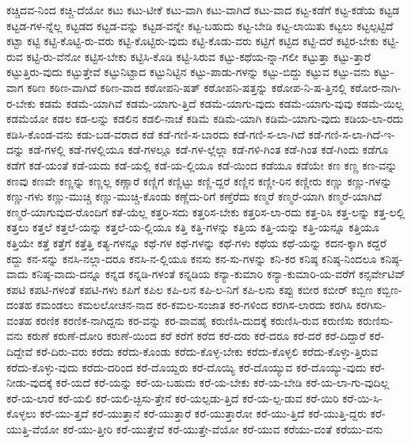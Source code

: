 {ಕಚ್ಚಿದವ-ನಿಂದ
ಕಚ್ಚಿ-ದೆಯೋ
ಕಟು
ಕಟು-ಟೀಕೆ
ಕಟು-ವಾಗಿ
ಕಟು-ವಾಗಿದೆ
ಕಟು-ವಾದ
ಕಟ್ಟ-ಕಡೆಗೆ
ಕಟ್ಟ-ಕಡೆಯ
ಕಟ್ಟಡ
ಕಟ್ಟಡ-ಗಳ-ನ್ನೆಲ್ಲ
ಕಟ್ಟಡದ
ಕಟ್ಟಡ-ವನ್ನು
ಕಟ್ಟಡ-ವನ್ನೇ
ಕಟ್ಟ-ಬಹುದು
ಕಟ್ಟ-ಬೇಡಿ
ಕಟ್ಟ-ಲಾಯಿತು
ಕಟ್ಟಲು
ಕಟ್ಟಲ್ಪಟ್ಟಿದೆ
ಕಟ್ಟಾ
ಕಟ್ಟಿ
ಕಟ್ಟಿ-ಕೊಟ್ಟಿ-ರು-ವರು
ಕಟ್ಟಿ-ಕೊಟ್ಟಿರು-ವುದು
ಕಟ್ಟಿ-ಕೊಡು-ವರು
ಕಟ್ಟಿಗೆ
ಕಟ್ಟಿದ
ಕಟ್ಟಿ-ದರೆ
ಕಟ್ಟಿರ-ಬೇಕು
ಕಟ್ಟಿ-ರುವ
ಕಟ್ಟಿ-ರು-ವೆನೋ
ಕಟ್ಟಿಸ-ಬೇಕು
ಕಟ್ಟಿಸಿ-ಕೊಡಿ
ಕಟ್ಟಿ-ಸಿರುವ
ಕಟ್ಟು-ಕಥೆಯ-ನ್ನಾ-ಗಲೀ
ಕಟ್ಟುತ್ತಾ
ಕಟ್ಟು-ತ್ತಾರೆ
ಕಟ್ಟುತ್ತಿರು-ವುದು
ಕಟ್ಟುತ್ತೇವೆ
ಕಟ್ಟುನಿಟ್ಟಾದ
ಕಟ್ಟುನಿಟ್ಟಿನ
ಕಟ್ಟು-ಪಾಡು-ಗಳನ್ನು
ಕಟ್ಟು-ಬಿದ್ದು
ಕಟ್ಟುವ
ಕಟ್ಟು-ವನು
ಕಟ್ಟು-ವಾಗ
ಕಠಿಣ
ಕಠಿಣ-ವಾಗಿದೆ
ಕಠಿಣ-ವಾದ
ಕಠೋಪನಿ-ಷತ್
ಕಠೋಪನಿ-ಷತ್ತನ್ನು
ಕಠೋಪ-ನಿ-ಷ-ತ್ತಿನಲ್ಲಿ
ಕಠೋರ-ನಾಗಿ-ರ-ಬೇಕು
ಕಡಮೆ
ಕಡಮೆ-ಯಾಗಿವೆ
ಕಡಮೆ-ಯಾಗು-ತ್ತಿದೆ
ಕಡಮೆ-ಯಾಗು-ವುದು
ಕಡಮೆ-ಯಾಗು-ವುವು
ಕಡಮೆ-ಯಿಲ್ಲ
ಕಡಮೆಯೋ
ಕಡಲ
ಕಡ-ಲನ್ನು
ಕಡಲಿನ
ಕಡಲಿ-ನಾಚೆ
ಕಡಿಮೆ
ಕಡಿಮೆ-ಯಾಗಿ
ಕಡಿಮೆ-ಯಾಗು-ವುದು
ಕಡಿಯ-ಲಾ-ರದು
ಕಡಿಸಿ-ಕೊಂಡ-ವನು
ಕಡು-ಬಡ-ವರಾದ
ಕಡೆ
ಕಡೆ-ಗಣಿ-ಸ-ಬಾರದು
ಕಡೆ-ಗಣಿ-ಸ-ಲಾ-ಗಿದೆ
ಕಡೆ-ಗಣಿ-ಸ-ಲಾ-ಗಿದೆ-ಇ-ದನ್ನು
ಕಡೆ-ಗಳಲ್ಲಿ
ಕಡೆ-ಗಳಲ್ಲಿಯೂ
ಕಡೆ-ಗಳಲ್ಲೂ
ಕಡೆ-ಗಳ-ಲ್ಲೆಲ್ಲಾ
ಕಡೆ-ಗಳಿ-ಗಿಂತ
ಕಡೆ-ಗಿಂತ
ಕಡೆ-ಗಿಂದು
ಕಡೆಗೂ
ಕಡೆಗೆ
ಕಡೆ-ಯಂತೆ
ಕಡೆ-ಯದು
ಕಡೆ-ಯಲ್ಲಿ
ಕಡೆ-ಯ-ಲ್ಲಿಯೂ
ಕಡೆ-ಯಿಂದ
ಕಡೆಯೂ
ಕಡೆಯೇ
ಕಣ
ಕಣ್ಣ
ಕಣ-ವನ್ನು
ಕಣವು
ಕಣವೇ
ಕಣ್ಣನ್ನು
ಕಣ್ಣಲ್ಲ
ಕಣ್ಣಾರೆ
ಕಣ್ಣಿಗೆ
ಕಣ್ಣಿಟ್ಟು
ಕಣ್ಣಿ-ದ್ದರೆ
ಕಣ್ಣಿನ
ಕಣ್ಣೀ-ರಿನ
ಕಣ್ಣೀರು
ಕಣ್ಣು
ಕಣ್ಣು-ಗಳನ್ನು
ಕಣ್ಣು-ಗಳು
ಕಣ್ಣು-ಮುಚ್ಚಿ
ಕಣ್ಣು-ಮುಚ್ಚಿ-ಕೊಂಡು
ಕಣ್ಣೆದು-ರಿಗೆ
ಕಣ್ತೆರೆದು
ಕಣ್ಮರೆ
ಕಣ್ಮರೆ-ಯಾಗಿ
ಕಣ್ಮರೆ-ಯಾಗಿದೆ
ಕಣ್ಮರೆ-ಯಾಗುವುದ-ರೊಂದಿಗೆ
ಕತೆ-ಯೆಲ್ಲ
ಕತ್ತರಿ-ಸದು
ಕತ್ತರಿಸ-ಬೇಕು
ಕತ್ತರಿಸ-ಲಾ-ರದು
ಕತ್ತ-ರಿಸಿ
ಕತ್ತ-ಲನ್ನು
ಕತ್ತ-ಲಲ್ಲಿ
ಕತ್ತಲು
ಕತ್ತಲೆ
ಕತ್ತಲೆ-ಯನ್ನು
ಕತ್ತಲೆ-ಯ-ಲ್ಲಿಯೂ
ಕತ್ತಿ
ಕತ್ತಿ-ಗಳನ್ನು
ಕತ್ತಿಯ
ಕತ್ತಿ-ಯನ್ನು
ಕತ್ತಿ-ಯನ್ನೂ
ಕತ್ತಿಯೂ
ಕತ್ತಿಯೇ
ಕತ್ತೆ
ಕತ್ತೆಗೆ
ಕತ್ತೆತ್ತಿ
ಕತ್ಯ-ಗಳನ್ನೂ
ಕಥೆ-ಗಳ
ಕಥೆ-ಗಳನ್ನು
ಕಥೆ-ಗಳು
ಕಥೆಯ
ಕಥೆ-ಯನ್ನು
ಕದನ-ಕ್ಕಾಗಿ
ಕದ್ದರೆ
ಕದ್ದು
ಕನ-ಸನ್ನು
ಕನಸಿ-ನಲ್ಲಾ-ದರೂ
ಕನಸಿ-ನ-ಲ್ಲಿಯೂ
ಕನಸು
ಕನ-ಸು-ಗಳನ್ನು
ಕನಿ-ಕರ
ಕನಿಷ್ಠ
ಕನಿಷ್ಠ-ನಿಂದಲೂ
ಕನಿಷ್ಠ-ವಾದು
ಕನಿಷ್ಠ-ವಾದು-ದನ್ನೂ
ಕನ್ನಡ
ಕನ್ನಡಿ-ಗಳಂತೆ
ಕನ್ನಡಿಯ
ಕನ್ಯಾ-ಕುಮಾರಿ
ಕನ್ಯಾ-ಕುಮಾರಿ-ಯ-ವರೆಗೆ
ಕನ್ಸರ್ವೇಟಿವ್
ಕಪಟಿ
ಕಪಟಿ-ಗಳಂತೆ
ಕಪಟಿ-ಗಳು
ಕಪಿಗೆ
ಕಪಿಲ
ಕಪಿ-ಲನ
ಕಪಿ-ಲ-ನಿಗೆ
ಕಪಿ-ಲನು
ಕಪ್ಪು
ಕಬೀರ
ಕಬೀರ್
ಕಬ್ಬಿಣ
ಕಬ್ಬಿಣ-ದಂತಹ
ಕಮಂಡಲು
ಕಮಲಲೋಚನ-ನಾದ
ಕರ-ಕಮಲ-ಸಂಜಾತ
ಕರ-ಗಳಿಂದ
ಕರಗಿಸ-ಲಾರದು
ಕರಗಿಸಿ
ಕರಗಿಸು-ವಂತಹ
ಕರಣಿಕ
ಕರಣಿಕ-ನಾಗಿದ್ದನು
ಕರ-ವನ್ನು
ಕರ-ವಾವಹೈ
ಕರುಣಿಸಿ-ದುದಕ್ಕೆ
ಕರುಣಿಸಿ-ರುವ
ಕರುಣಿಸು
ಕರುಣಿಸು-ವನು
ಕರುಣೆ
ಕರುಣೆ-ದೋರಿ
ಕರುಣೆ-ಯಿಂದ
ಕರೆ
ಕರೆಗೆ
ಕರೆದ
ಕರೆ-ದರು
ಕರೆ-ದರೂ
ಕರೆ-ದರೆ
ಕರೆ-ದಿದ್ದಾರೆ
ಕರೆ-ದಿದ್ದೇವೆ
ಕರೆ-ದಿರು-ವರು
ಕರೆದು
ಕರೆದು-ಕೊಂಡು
ಕರೆದು-ಕೊಳ್ಳ-ಬೇಕು
ಕರೆದು-ಕೊಳ್ಳಲಿ
ಕರೆದು-ಕೊಳ್ಳು-ತ್ತಿರುವ
ಕರೆದು-ಕೊಳ್ಳು-ವುದು
ಕರೆದು-ದರಿಂದ
ಕರೆ-ದೊಯ್ದರು
ಕರೆ-ದೊಯ್ಯಿ
ಕರೆ-ದೊಯ್ಯುವ
ಕರೆ-ದೊಯ್ಯು-ವುದು
ಕರೆ-ನೀಡು-ವುದಕ್ಕೆ
ಕರೆ-ಯದೆ
ಕರೆ-ಯನ್ನು
ಕರೆ-ಯ-ಬಹುದು
ಕರೆ-ಯ-ಬೇಕು
ಕರೆ-ಯ-ಬೇಡಿ
ಕರೆ-ಯ-ಲಾ-ಗು-ವುದಿಲ್ಲ
ಕರೆ-ಯ-ಲಾರೆ
ಕರೆ-ಯಲಿ
ಕರೆ-ಯಲಿ-ಚ್ಛಿಸು-ತ್ತೇನೆ
ಕರೆ-ಯಲ್ಪಡು-ತ್ತಿದೆ
ಕರೆ-ಯ-ಲ್ಪ-ಡುವ
ಕರೆ-ಯಿರಿ
ಕರೆ-ಯಿ-ಸಿ-ಕೊಳ್ಳಲು
ಕರೆ-ಯು-ತ್ತದೆ
ಕರೆ-ಯುತ್ತಾನೆ
ಕರೆ-ಯುತ್ತಾರೆ
ಕರೆ-ಯುತ್ತಾರೋ
ಕರೆ-ಯು-ತ್ತಿದೆ
ಕರೆ-ಯುತ್ತಿ-ದ್ದರು
ಕರೆ-ಯುತ್ತಿ-ವೆಯೋ
ಕರೆ-ಯು-ತ್ತೀರಿ
ಕರೆ-ಯುತ್ತೇವೆ
ಕರೆ-ಯುತ್ತೇ-ವೆಯೋ
ಕರೆ-ಯುವ
ಕರೆಯು-ವಂತೆ
ಕರೆಯು-ವನು
}
